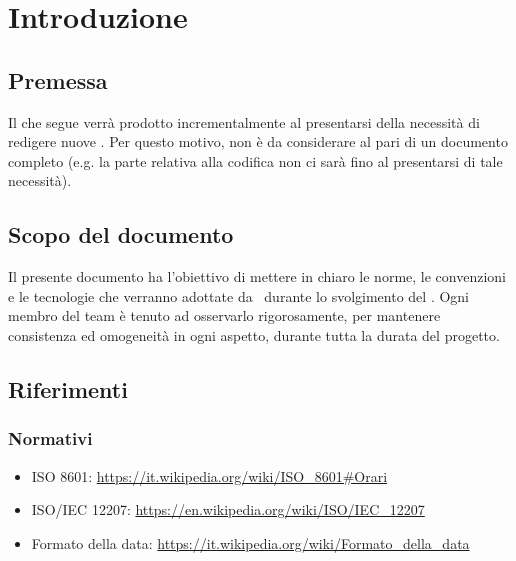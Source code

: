 \section{Introduzione}

    \subsection{Premessa}
    Il  che segue verrà prodotto incrementalmente al presentarsi della necessità di redigere nuove .
    Per questo motivo, non è da considerare al pari di un documento completo (e.g. la parte relativa alla codifica non ci sarà fino
    al presentarsi di tale necessità).

    \subsection{Scopo del documento}
    Il presente documento ha l’obiettivo di mettere in chiaro le norme, le convenzioni e le tecnologie che verranno adottate da \gruppo\ durante lo svolgimento del . Ogni membro del team \`e tenuto ad osservarlo rigorosamente, per mantenere consistenza ed omogeneit\`a in ogni aspetto, durante tutta la durata del progetto.\par

    

    

\subsection{Riferimenti}

    \subsubsection{Normativi}	\label{rifnorma}
    \begin{itemize}
    	\item ISO 8601: \url{https://it.wikipedia.org/wiki/ISO\_8601#Orari}
    	\item ISO/IEC 12207: \url{https://en.wikipedia.org/wiki/ISO/IEC_12207}
    	\item Formato della data: \url{https://it.wikipedia.org/wiki/Formato\_della\_data}
    \end{itemize}

